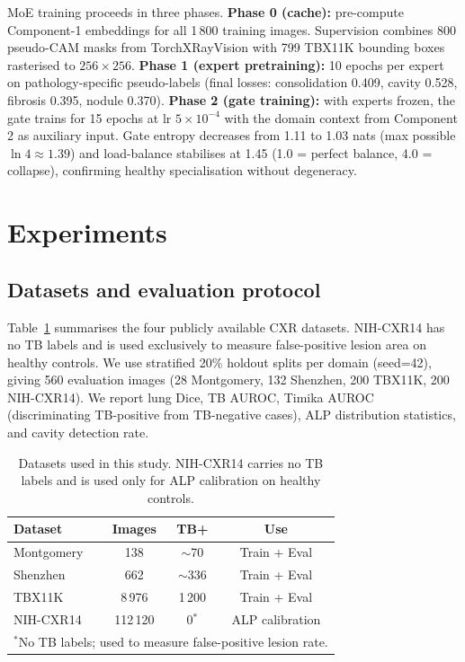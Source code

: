 \documentclass{article}
\begin{document}
MoE training proceeds in three phases. \textbf{Phase 0 (cache):} pre-compute Component-1 embeddings for all 1\,800 training images. Supervision combines 800 pseudo-CAM masks from TorchXRayVision with 799 TBX11K bounding boxes rasterised to $256{\times}256$. \textbf{Phase 1 (expert pretraining):} 10 epochs per expert on pathology-specific pseudo-labels (final losses: consolidation 0.409, cavity 0.528, fibrosis 0.395, nodule 0.370). \textbf{Phase 2 (gate training):} with experts frozen, the gate trains for 15 epochs at lr $5{\times}10^{-4}$ with the domain context from Component\,2 as auxiliary input. Gate entropy decreases from 1.11 to 1.03 nats (max possible $\ln 4 \approx 1.39$) and load-balance stabilises at 1.45 (1.0 = perfect balance, 4.0 = collapse), confirming healthy specialisation without degeneracy.

\FloatBarrier
\section{Experiments}

\subsection{Datasets and evaluation protocol}

Table~\ref{tab:datasets} summarises the four publicly available CXR datasets. NIH-CXR14 has no TB labels and is used exclusively to measure false-positive lesion area on healthy controls. We use stratified 20\% holdout splits per domain (seed=42), giving 560 evaluation images (28 Montgomery, 132 Shenzhen, 200 TBX11K, 200 NIH-CXR14). We report lung Dice, TB AUROC, Timika AUROC (discriminating TB-positive from TB-negative cases), ALP distribution statistics, and cavity detection rate.

\begin{table}[!htbp]
\caption{Datasets used in this study. NIH-CXR14 carries no TB labels and is used only for ALP calibration on healthy controls.}
\label{tab:datasets}
\centering
\small
\begin{tabular}{lccc}
\toprule
Dataset & Images & TB+ & Use \\
\midrule
Montgomery & 138 & $\sim$70 & Train + Eval \\
Shenzhen & 662 & $\sim$336 & Train + Eval \\
TBX11K & 8\,976 & 1\,200 & Train + Eval \\
NIH-CXR14 & 112\,120 & 0$^*$ & ALP calibration \\
\bottomrule
\multicolumn{4}{l}{\footnotesize $^*$No TB labels; used to measure false-positive lesion rate.}
\end{tabular}
\end{table}
\end{document}
